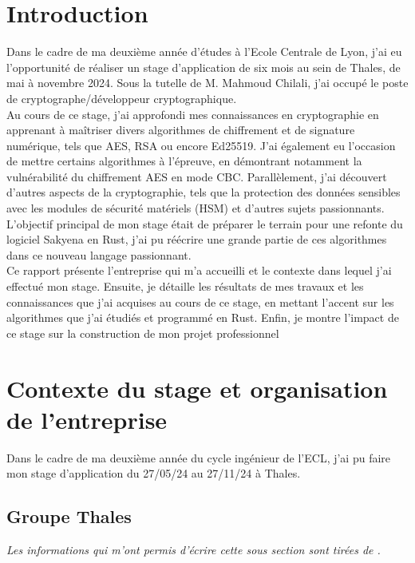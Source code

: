 \documentclass[a4paper, 12pt]{article}
\begin{document}
\section{Introduction}
Dans le cadre de ma deuxième année d'études à l'Ecole Centrale de Lyon, j'ai eu l'opportunité de réaliser un stage d'application de six mois au sein de Thales, de mai à novembre 2024. Sous la tutelle de M. Mahmoud Chilali, j'ai occupé le poste de cryptographe/développeur cryptographique. \\

Au cours de ce stage, j'ai approfondi mes connaissances en cryptographie en apprenant à maîtriser divers algorithmes de chiffrement et de signature numérique, tels que AES, RSA ou encore Ed25519. J'ai également eu l'occasion de mettre certains algorithmes à l'épreuve, en démontrant notamment la vulnérabilité du chiffrement AES en mode CBC.
Parallèlement, j'ai découvert d'autres aspects de la cryptographie, tels que la protection des données sensibles avec les modules de sécurité matériels (HSM) et d'autres sujets passionnants. \\

L'objectif principal de mon stage était de préparer le terrain pour une refonte du logiciel Sakyena en Rust, j'ai pu réécrire une grande partie de ces algorithmes dans ce nouveau langage passionnant. \\

Ce rapport présente l'entreprise qui m'a accueilli et le contexte dans lequel j'ai effectué mon stage. Ensuite, je détaille les résultats de mes travaux et les connaissances que j'ai acquises au cours de ce stage, en mettant l'accent sur les algorithmes que j'ai étudiés et programmé en Rust. Enfin, je montre l'impact de ce stage sur la construction de mon projet professionnel

\section{Contexte du stage et organisation de l'entreprise}
Dans le cadre de ma deuxième année du cycle ingénieur de l'ECL, j'ai pu faire mon stage d'application du 27/05/24 au 27/11/24 à Thales.
\subsection{Groupe Thales}
\noindent\emph{Les informations qui m'ont permis d'écrire cette sous section sont tirées de \cite{thalesgroupe}.}\\
\end{document}
